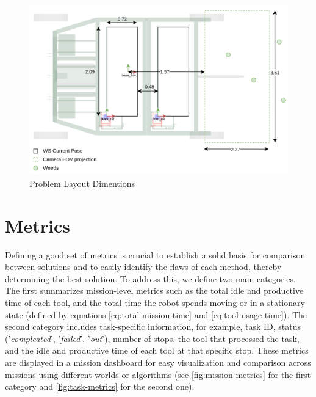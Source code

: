 \begin{figure}[bth]
    \centering
    \includegraphics[width=\linewidth]{gfx/ch03/problem_layout.png}
    \caption{Problem Layout Dimentions}
    \label{fig:problem-layout.png}
\end{figure}

\section{Metrics}
Defining a good set of metrics is crucial to establish a solid basis for comparison between solutions and to easily identify the flaws of each method, thereby determining the best solution. To address this, we define two main categories. The first summarizes mission-level metrics such as the total idle and productive time of each tool, and the total time the robot spends moving or in a stationary state (defined by equations \ref{eq:total-mission-time} and \ref{eq:tool-usage-time}). The second category includes task-specific information, for example, task ID, status ('\textit{compleated}', '\textit{failed}', '\textit{out}'), number of stops, the tool that processed the task, and the idle and productive time of each tool at that specific stop. These metrics are displayed in a mission dashboard for easy visualization and comparison across missions using different worlds or algorithms (see \autoref{fig:mission-metrics} for the first category and \ref{fig:task-metrics} for the second one).

